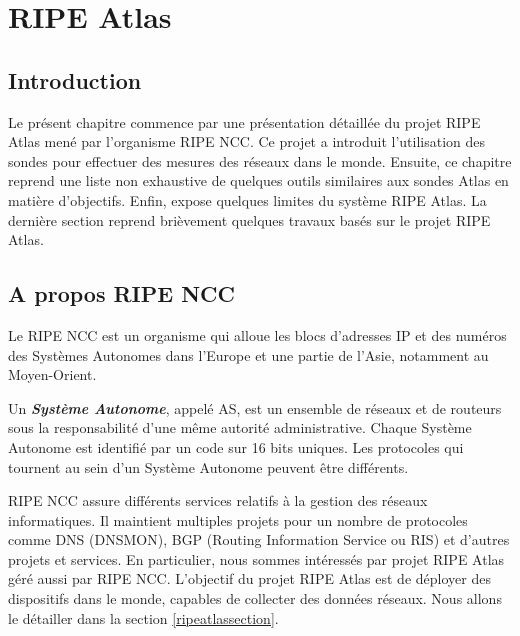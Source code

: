 
\chapter{RIPE Atlas}

\section{Introduction}



Le présent chapitre commence par une présentation détaillée du projet RIPE Atlas mené par l'organisme RIPE NCC.  Ce projet  a introduit l'utilisation des sondes pour  effectuer des mesures des réseaux dans le monde.
Ensuite, ce chapitre reprend une liste non exhaustive  de quelques outils similaires aux sondes Atlas en matière d'objectifs. Enfin, expose quelques limites du système RIPE Atlas. La dernière section reprend brièvement quelques travaux basés sur le projet RIPE Atlas.


\section{A propos RIPE NCC}
Le RIPE NCC  est un organisme qui alloue les blocs d'adresses IP et des numéros des Systèmes Autonomes dans l'Europe et une partie de l'Asie, notamment au Moyen-Orient. 

\begin{tcolorbox}
	Un\textit{ \textbf{Système Autonome}}, appelé AS, est un ensemble de réseaux et de routeurs sous la responsabilité d'une même autorité administrative. Chaque Système Autonome est identifié par un code sur 16 bits uniques. Les protocoles qui tournent au sein d'un Système Autonome peuvent être différents.
\end{tcolorbox}

RIPE NCC assure différents services relatifs à la gestion des réseaux informatiques. Il maintient multiples projets  pour un nombre de protocoles comme DNS (DNSMON), BGP (Routing Information Service ou RIS) et d'autres projets et services. En particulier, nous sommes intéressés  par projet RIPE Atlas géré aussi par RIPE NCC. L'objectif du projet RIPE Atlas est de déployer des dispositifs dans le monde, capables de collecter des données réseaux. Nous allons le détailler dans la section \ref{ripeatlassection}. 


